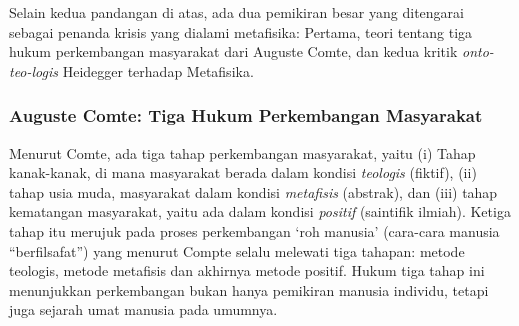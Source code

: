 \documentclass[10pt,a4paper]{article}
\begin{document}
\begin{multicols}{2}
Selain kedua pandangan di atas, ada dua pemikiran besar yang ditengarai
sebagai penanda krisis yang dialami metafisika: Pertama, teori tentang
tiga hukum perkembangan masyarakat dari Auguste Comte, dan kedua kritik
\emph{onto-teo-logis} Heidegger terhadap Metafisika.

\hypertarget{auguste-comte-tiga-hukum-perkembangan-masyarakat}{%
\subsubsection{Auguste Comte: Tiga Hukum Perkembangan
Masyarakat}\label{auguste-comte-tiga-hukum-perkembangan-masyarakat}}

Menurut Comte, ada tiga tahap perkembangan masyarakat, yaitu (i) Tahap
kanak-kanak, di mana masyarakat berada dalam kondisi \emph{teologis}
(fiktif), (ii) tahap usia muda, masyarakat dalam kondisi
\emph{metafisis} (abstrak), dan (iii) tahap kematangan masyarakat, yaitu
ada dalam kondisi \emph{positif} (saintifik ilmiah). Ketiga tahap itu
merujuk pada proses perkembangan `roh manusia' (cara-cara manusia
``berfilsafat'') yang menurut Compte selalu melewati tiga tahapan:
metode teologis, metode metafisis dan akhirnya metode positif. Hukum
tiga tahap ini menunjukkan perkembangan bukan hanya pemikiran manusia
individu, tetapi juga sejarah umat manusia pada umumnya.


\end{multicols}
\end{document}
